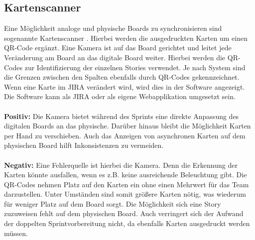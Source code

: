 \documentclass[12pt,titlepage]{scrartcl}
\begin{document}
		\subsection{Kartenscanner}
		Eine Möglichkeit analoge und physische Boards zu synchronisieren sind sogenannte Kartenscanner \cite{cardscanner, truffler}. Hierbei werden die ausgedruckten Karten um einen QR-Code ergänzt. Eine Kamera ist auf das Board gerichtet und leitet jede Veränderung am Board an das digitale Board weiter. Hierbei werden die QR-Codes zur Identifizierung der einzelnen Stories verwendet. Je nach System sind die Grenzen zwischen den Spalten ebenfalls durch QR-Codes gekennzeichnet. Wenn eine Karte im JIRA verändert wird, wird dies in der Software angezeigt. Die Software kann als JIRA oder als eigene Webapplikation umgesetzt sein. 
		\\ \\
		\textbf{Positiv: }Die Kamera bietet während des Sprints eine direkte Anpassung des digitalen Boards an das physische. Darüber hinaus bleibt die Möglichkeit Karten per Hand zu verschieben. Auch das Anzeigen von asynchronen Karten auf dem physischen Board hilft Inkonsistenzen zu vermeiden.
		\\ \\
		\textbf{Negativ: }Eine Fehlerquelle ist hierbei die Kamera. Denn die Erkennung der Karten könnte ausfallen, wenn es z.B. keine ausreichende Beleuchtung gibt. Die QR-Codes nehmen Platz auf den Karten ein ohne einen Mehrwert für das Team darzustellen. Unter Umständen sind somit größere Karten nötig, was wiederum für weniger Platz auf dem Board sorgt. Die Möglichkeit sich eine Story zuzuweisen fehlt auf dem physischen Board. Auch verringert sich der Aufwand der doppelten Sprintvorbereitung nicht, da ebenfalls Karten ausgedruckt werden müssen.
\end{document}
